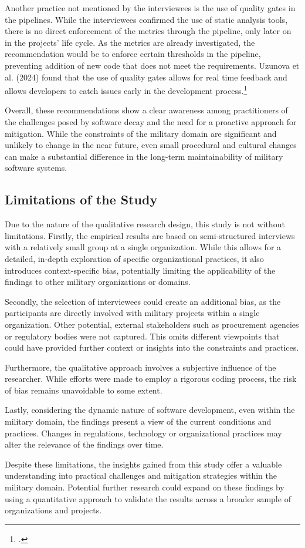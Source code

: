 Another practice not mentioned by the interviewees is the use of quality gates in the pipelines. While the interviewees confirmed the use of static analysis tools, there is no direct enforcement of the metrics through the pipeline, only later on in the projects' life cycle.
As the metrics are already investigated, the recommendation would be to enforce certain thresholds in the pipeline, preventing addition of new code that does not meet the requirements. Uzunova et al. (2024) found that the use of quality gates allows for real time feedback and allows developers to catch issues early in the development process.\footcite[8]{uzunovaQualityGatesSoftware2024}

Overall, these recommendations show a clear awareness among practitioners of the challenges posed by software decay and the need for a proactive approach for mitigation. While the constraints of the military domain are significant and unlikely to change in the near future, even small procedural and 
cultural changes can make a substantial difference in the long-term maintainability of military software systems.

\subsection{Limitations of the Study}
Due to the nature of the qualitative research design, this study is not without limitations. Firstly, the empirical results are based on semi-structured interviews with a relatively small group at a single organization.
While this allows for a detailed, in-depth exploration of specific organizational practices, it also introduces context-specific bias, potentially limiting the applicability of the findings to other military organizations or domains.

Secondly, the selection of interviewees could create an additional bias, as the participants are directly involved with military projects within a single organization. Other potential, external stakeholders such as procurement agencies
or regulatory bodies were not captured. This omits different viewpoints that could have provided further context or insights into the constraints and practices.

Furthermore, the qualitative approach involves a subjective influence of the researcher. While efforts were made to employ a rigorous coding process, the risk of bias remains unavoidable to some extent.

Lastly, considering the dynamic nature of software development, even within the military domain, the findings present a view of the current conditions and practices. Changes in regulations, technology or organizational practices may alter the relevance of the findings over time.

Despite these limitations, the insights gained from this study offer a valuable understanding into practical challenges and mitigation strategies within the military domain. Potential further research could expand on these findings by using a quantitative approach to validate the results across a broader sample of organizations and projects.
